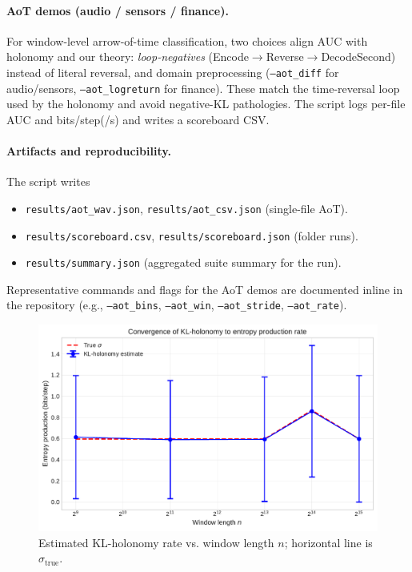 \documentclass[11pt]{article}
\newcommand{\1}{\mathbbm{1}}
\begin{document}
\paragraph{AoT demos (audio / sensors / finance).} For window-level arrow-of-time classification, two choices align AUC with holonomy and our theory: \emph{loop-negatives}
(Encode$\to$Reverse$\to$DecodeSecond) instead of literal reversal, and domain preprocessing (\texttt{--aot\_diff} for audio/sensors, \texttt{--aot\_logreturn} for finance). These match the time-reversal loop used by the holonomy and avoid negative-KL pathologies. The script logs per-file AUC and bits/step(/s) and writes a scoreboard CSV.

\paragraph{Artifacts and reproducibility.} The script writes
\begin{itemize}[leftmargin=1.25em]
\item \texttt{results/aot\_wav.json}, \texttt{results/aot\_csv.json} (single-file AoT).
\item \texttt{results/scoreboard.csv}, \texttt{results/scoreboard.json} (folder runs).
\item \texttt{results/summary.json} (aggregated suite summary for the run).
\end{itemize}
Representative commands and flags for the AoT demos are documented inline in the repository (e.g., \texttt{--aot\_bins}, \texttt{--aot\_win}, \texttt{--aot\_stride}, \texttt{--aot\_rate}).



\begin{figure}[h!]
  \centering
  \includegraphics[width=0.9\linewidth]{figures/markov_convergence.pdf}
  \caption{Estimated KL-holonomy rate vs. window length $n$; horizontal line is $\sigma_{\text{true}}$.}
  \label{fig:markov-conv}
\end{figure}
\end{document}
